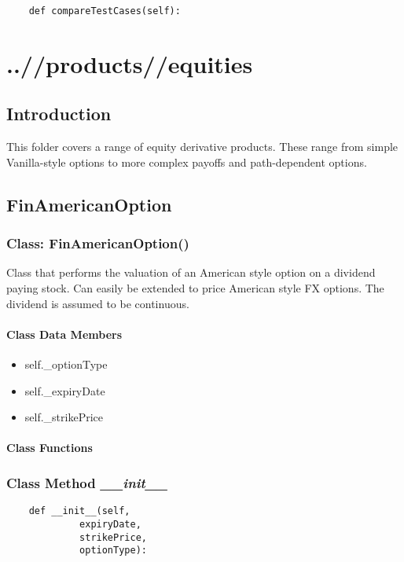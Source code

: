 \documentclass[twoside,11pt]{book}
\begin{document}
\begin{lstlisting}
    def compareTestCases(self):
\end{lstlisting}


\chapter{..//products//equities}
\section{Introduction}
This folder covers a range of equity derivative products. These range from simple Vanilla-style options to more complex payoffs and path-dependent options. 
\newpage
\section{FinAmericanOption}

\subsection{Class: FinAmericanOption()}
Class that performs the valuation of an American style option on a dividend paying stock. Can easily be extended to price American style FX options. The dividend is assumed to be continuous. 

\subsubsection{Class Data Members}
\begin{itemize}
\item{self.\_optionType}
\item{self.\_expiryDate}
\item{self.\_strikePrice}
\end{itemize}

\subsubsection{Class Functions}

\subsection{Class Method {\it \_\_init\_\_}}


\begin{lstlisting}
    def __init__(self,
             expiryDate,
             strikePrice,
             optionType):
\end{lstlisting}
\end{document}
